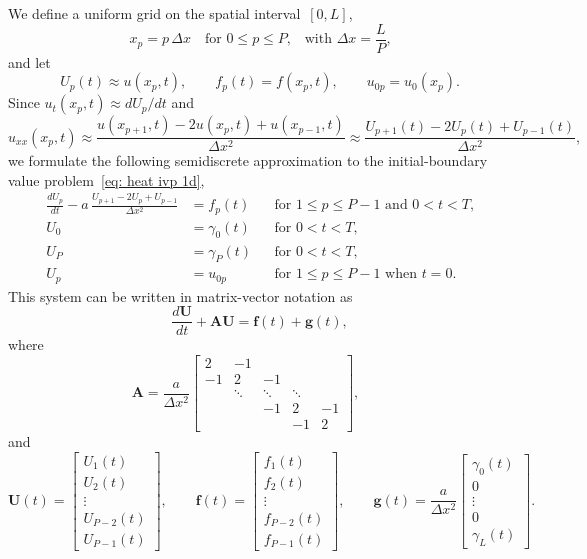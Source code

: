 We define a uniform grid on the spatial interval~$[0,L]$,
\[
x_p=p\,\Delta x\quad\text{for $0\le p\le P$,}
	\quad\text{with $\Delta x=\frac{L}{P}$,}
\]
and let
\[
U_p(t)\approx u(x_p,t),\qquad f_p(t)=f(x_p,t),\qquad u_{0p}=u_0(x_p).
\]
Since $u_t(x_p,t)\approx dU_p/dt$ and
\[
u_{xx}(x_p,t)\approx\frac{u(x_{p+1},t)-2u(x_p,t)+u(x_{p-1},t)}{\Delta x^2}
	\approx\frac{U_{p+1}(t)-2U_p(t)+U_{p-1}(t)}{\Delta x^2},
\]
we formulate the following semidiscrete approximation to the initial-boundary 
value problem~\eqref{eq: heat ivp 1d},
\begin{equation}\label{eq: semidiscrete heat 1d}
\begin{aligned}
\frac{dU_p}{dt}-a\,\frac{U_{p+1}-2U_p+U_{p-1}}{\Delta x^2}&=f_p(t)&
	&\text{for $1\le p\le P-1$ and $0<t<T$,}\\
U_0&=\gamma_0(t)&&\text{for $0<t<T$,}\\
U_P&=\gamma_P(t)&&\text{for $0<t<T$,}\\
U_p&=u_{0p}&&\text{for $1\le p\le P-1$ when $t=0$.}
\end{aligned}
\end{equation}
This system can be written in matrix-vector notation as
\begin{equation}\label{eq: ODE system}
\frac{d\boldsymbol{U}}{dt}+\boldsymbol{A}\boldsymbol{U}=\boldsymbol{f}(t)
	+\boldsymbol{g}(t),
\end{equation}
where
\[
\boldsymbol{A}=\frac{a}{\Delta x^2}\begin{bmatrix}
 2&    -1&      &      &\\
-1&     2&    -1&      &\\
  &\ddots&\ddots&\ddots&\\
  &      &    -1&     2&-1\\
  &      &      &    -1& 2\end{bmatrix},\qquad
\]
and
\begin{equation}\label{eq: U f g semidiscrete 1d}
\boldsymbol{U}(t)=\begin{bmatrix}
U_1(t)\\ U_2(t)\\ \vdots\\ U_{P-2}(t)\\ U_{P-1}(t)\end{bmatrix},\qquad
\boldsymbol{f}(t)=\begin{bmatrix}
f_1(t)\\ f_2(t)\\ \vdots\\ f_{P-2}(t)\\ f_{P-1}(t)\end{bmatrix},\qquad
\boldsymbol{g}(t)=\frac{a}{\Delta x^2}\begin{bmatrix}
\gamma_0(t)\\ 0\\ \vdots\\ 0\\ \gamma_L(t)\end{bmatrix}.
\end{equation}
